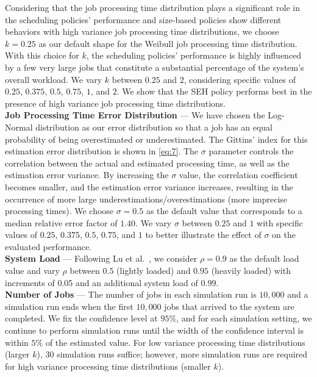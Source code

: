 Considering that the job processing time distribution plays a significant role in the scheduling policies' performance and size-based policies show different behaviors with high variance job processing time distributions, we choose $k=0.25$ as our default shape for the Weibull job processing time distribution. With this choice for $k$, the scheduling policies' performance is highly influenced by a few very large jobs that constitute a substantial percentage of the system's overall workload. 
We vary $k$ between $0.25$ and $2$, considering specific values of $0.25$, $0.375$, $0.5$, $0.75$, $1$, and $2$. We show that the SEH policy performs best in the presence of high variance job processing time distributions. \\



\textbf{Job Processing Time Error Distribution} --- We have chosen the Log-Normal distribution as our error distribution so that a job has an equal probability of being overestimated or underestimated. The Gittins' index for this estimation error distribution is shown in \eqref{eq:7}. The $\sigma$ parameter controls the correlation between the actual and estimated processing time, as well as the estimation error variance. By increasing the $\sigma$ value,  the correlation coefficient becomes smaller, and the estimation error variance increases, resulting in the occurrence of more large underestimations/overestimations (more imprecise processing times). We choose $\sigma=0.5$ as the default value that corresponds to a median relative error factor of $1.40$. We vary $\sigma$ between $0.25$ and $1$ with specific values of $0.25$, $0.375$, $0.5$, $0.75$, and $1$ to better illustrate the effect of $\sigma$ on the evaluated performance. \\

\textbf{System Load} --- Following Lu et al.\ \cite{lu2004size}, we consider $\rho = 0.9$ as the default load value and vary $\rho$ between $0.5$ (lightly loaded) and $0.95$ (heavily loaded) with increments of 0.05 and an additional system load of $0.99$. \\



\textbf{Number of Jobs} --- The number of jobs in each simulation run is $10,000$ and a simulation run ends when the first $10,000$ jobs that arrived to the system are completed. We fix the confidence level at $95\%$, and for each simulation setting, we continue to perform simulation runs until the width of the confidence interval is within $5\%$ of the estimated value. For low variance processing time distributions (larger $k$), $30$ simulation runs suffice; however, more simulation runs are required for high variance processing time distributions (smaller $k$).



